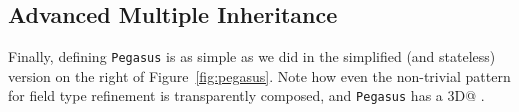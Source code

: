 \subsection{Advanced Multiple Inheritance}
Finally, defining \texttt{Pegasus} is as simple as we did in the simplified
(and stateless) version on the right of Figure~\ref{fig:pegasus}.
 Note how even the non-trivial pattern for field type refinement is
transparently composed, and \texttt{Pegasus} has a \Q@Point3D@
\Q@location@.%



